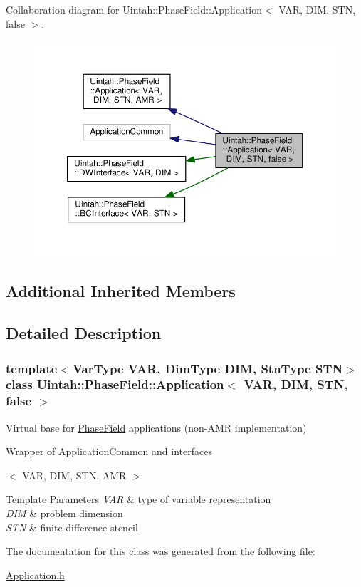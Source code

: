 Collaboration diagram for Uintah\+:\+:Phase\+Field\+:\+:Application$<$ V\+AR, D\+IM, S\+TN, false $>$\+:\nopagebreak
\begin{figure}[H]
\begin{center}
\leavevmode
\includegraphics[width=350pt]{classUintah_1_1PhaseField_1_1Application_3_01VAR_00_01DIM_00_01STN_00_01false_01_4__coll__graph}
\end{center}
\end{figure}
\subsection*{Additional Inherited Members}


\subsection{Detailed Description}
\subsubsection*{template$<$Var\+Type V\+AR, Dim\+Type D\+IM, Stn\+Type S\+TN$>$\newline
class Uintah\+::\+Phase\+Field\+::\+Application$<$ V\+A\+R, D\+I\+M, S\+T\+N, false $>$}

Virtual base for \hyperlink{namespaceUintah_1_1PhaseField}{Phase\+Field} applications (non-\/\+A\+MR implementation) 

Wrapper of Application\+Common and interfaces

$<$ V\+AR, D\+IM, S\+TN, A\+MR $>$ 
\begin{DoxyTemplParams}{Template Parameters}
{\em V\+AR} & type of variable representation \\
\hline
{\em D\+IM} & problem dimension \\
\hline
{\em S\+TN} & finite-\/difference stencil \\
\hline
\end{DoxyTemplParams}


The documentation for this class was generated from the following file\+:\begin{DoxyCompactItemize}
\item 
\hyperlink{Application_8h}{Application.\+h}\end{DoxyCompactItemize}
